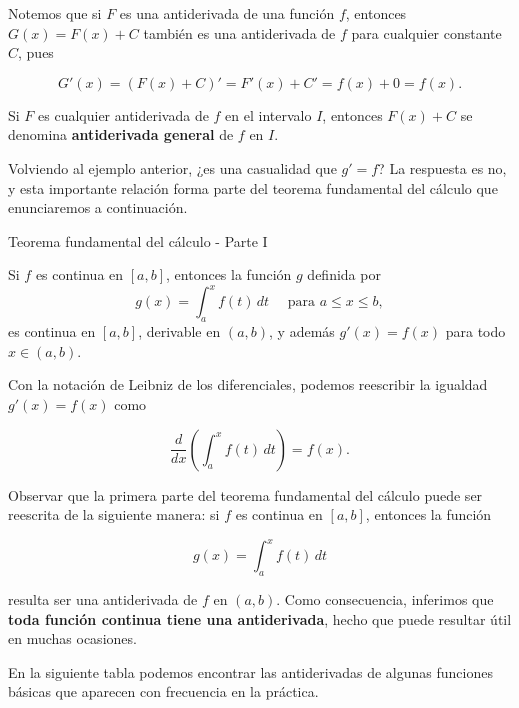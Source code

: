 \documentclass[
  letterpaper,
]{book}
\theoremstyle{plain}
\theoremstyle{remark}
\begin{document}
Notemos que si \(F\) es una antiderivada de una función \(f\), entonces
\(G(x)=F(x)+C\) también es una antiderivada de \(f\) para cualquier
constante \(C\), pues

\[
G'(x)=(F(x)+C)'=F'(x)+C'=f(x)+0=f(x).
\]

Si \(F\) es cualquier antiderivada de \(f\) en el intervalo \(I\),
entonces \(F(x)+C\) se denomina \textbf{antiderivada general} de \(f\)
en \(I\).

Volviendo al ejemplo anterior, ¿es una casualidad que \(g'=f\)? La
respuesta es no, y esta importante relación forma parte del teorema
fundamental del cálculo que enunciaremos a continuación.

\label{teo-TFC1}
Teorema fundamental del cálculo - Parte I

Si \(f\) es continua en \([a,b]\), entonces la función \(g\) definida
por \[
g(x) = \int_a^x f(t) \, dt \quad \text{ para } a \leq x \leq b,
\] es continua en \([a,b]\), derivable en \((a,b)\), y además
\(g'(x) = f(x)\) para todo \(x\in (a,b)\).

Con la notación de Leibniz de los diferenciales, podemos reescribir la
igualdad \(g'(x)=f(x)\) como

\[
\frac{d}{dx}\left(\int_a^x f(t)\,dt\right)=f(x).
\]

Observar que la primera parte del teorema fundamental del cálculo puede
ser reescrita de la siguiente manera: si \(f\) es continua en \([a,b]\),
entonces la función

\[
g(x)=\int_a^x f(t)\,dt
\]

resulta ser una antiderivada de \(f\) en \((a,b)\). Como consecuencia,
inferimos que \textbf{toda función continua tiene una antiderivada},
hecho que puede resultar útil en muchas ocasiones.

En la siguiente tabla podemos encontrar las antiderivadas de algunas
funciones básicas que aparecen con frecuencia en la práctica.
\end{document}
